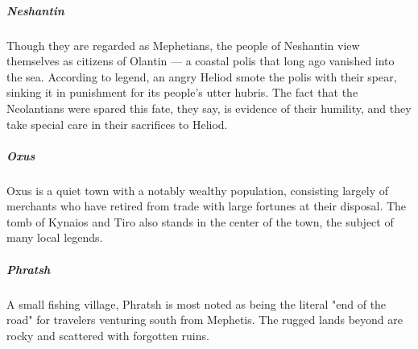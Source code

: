         \subparagraph{Neshantin} Though they are regarded as Mephetians, the people of Neshantin view themselves as citizens of Olantin --- a coastal polis that long ago vanished into the sea.
        According to legend, an angry Heliod smote the polis with their spear, sinking it in punishment for its people's utter hubris.
        The fact that the Neolantians were spared this fate, they say, is evidence of their humility, and they take special care in their sacrifices to Heliod.

        \thispagestyle{empty} %

        \subparagraph{Oxus} Oxus is a quiet town with a notably wealthy population, consisting largely of merchants who have retired from trade with large fortunes at their disposal.
        The tomb of Kynaios and Tiro also stands in the center of the town, the subject of many local legends.

        \newpage

        \subparagraph{Phratsh} A small fishing village, Phratsh is most noted as being the literal "end of the road" for travelers venturing south from Mephetis.
        The rugged lands beyond are rocky and scattered with forgotten ruins.

